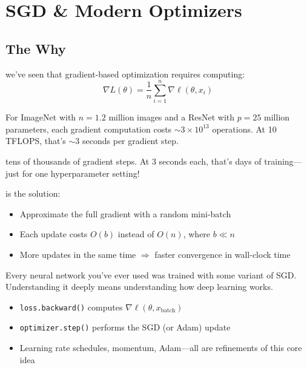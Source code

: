 \chapter{SGD \& Modern Optimizers}



\section{The Why}

 we've seen that gradient-based optimization requires computing:
\begin{equation}
    \nabla L(\theta) = \frac{1}{n} \sum_{i=1}^{n} \nabla \ell(\theta, x_i)
\end{equation}

For ImageNet with $n = 1.2$ million images and a ResNet with $p = 25$ million parameters, each gradient computation costs $\sim 3 \times 10^{13}$ operations. At 10 TFLOPS, that's $\sim 3$ seconds per gradient step.

 tens of thousands of gradient steps. At 3 seconds each, that's days of training---just for one hyperparameter setting!


 is the solution:
\begin{itemize}
    \item Approximate the full gradient with a random mini-batch
    \item Each update costs $O(b)$ instead of $O(n)$, where $b \ll n$
    \item More updates in the same time $\Rightarrow$ faster convergence in wall-clock time
\end{itemize}

 Every neural network you've ever used was trained with some variant of SGD. Understanding it deeply means understanding how deep learning works.

\begin{itemize}
    \item \texttt{loss.backward()} computes $\nabla \ell(\theta, x_{\text{batch}})$
    \item \texttt{optimizer.step()} performs the SGD (or Adam) update
    \item Learning rate schedules, momentum, Adam---all are refinements of this core idea
\end{itemize}



